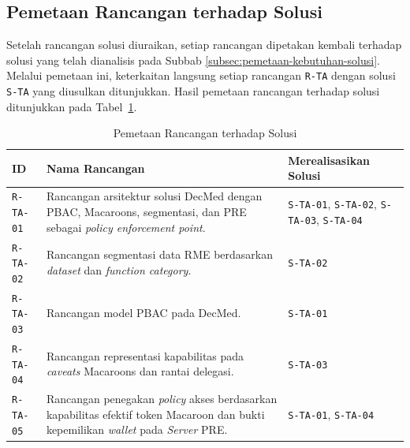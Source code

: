 \subsection{Pemetaan Rancangan terhadap Solusi}
\label{subsec:pemetaan-rancangan-solusi}

Setelah rancangan solusi diuraikan, setiap rancangan dipetakan kembali terhadap solusi yang telah dianalisis pada Subbab \ref{subsec:pemetaan-kebutuhan-solusi}. Melalui pemetaan ini, keterkaitan langsung setiap rancangan \texttt{R-TA} dengan solusi \texttt{S-TA} yang diusulkan ditunjukkan. Hasil pemetaan rancangan terhadap solusi ditunjukkan pada Tabel~\ref{tab:daftar-rancangan-solusi}.

\begin{table}[H]
	\centering
	\caption{Pemetaan Rancangan terhadap Solusi}
	\label{tab:daftar-rancangan-solusi}
	\small
	\begin{tabular}{|p{}|p{}|p{}|}
		\hline
		\textbf{ID}      & \textbf{Nama Rancangan}                                                                                                                                  & \textbf{Merealisasikan Solusi}                                         \\ \hline
		\texttt{R-TA-01} & Rancangan arsitektur solusi DecMed dengan PBAC, Macaroons, segmentasi, dan PRE sebagai \textit{policy enforcement point}.                                & \texttt{S-TA-01}, \texttt{S-TA-02}, \texttt{S-TA-03}, \texttt{S-TA-04} \\ \hline
		\texttt{R-TA-02} & Rancangan segmentasi data RME berdasarkan \textit{dataset} dan \textit{function category}.                                                               & \texttt{S-TA-02}                                                       \\ \hline
		\texttt{R-TA-03} & Rancangan model PBAC pada DecMed.                                                                                                                        & \texttt{S-TA-01}                                                       \\ \hline
		\texttt{R-TA-04} & Rancangan representasi kapabilitas pada \textit{caveats} Macaroons dan rantai delegasi.                                                                  & \texttt{S-TA-03}                                                       \\ \hline
		\texttt{R-TA-05} & Rancangan penegakan \textit{policy} akses berdasarkan kapabilitas efektif token Macaroon dan bukti kepemilikan \textit{wallet} pada \textit{Server} PRE. & \texttt{S-TA-01}, \texttt{S-TA-04}                                     \\ \hline

\end{tabular}
\end{table}
